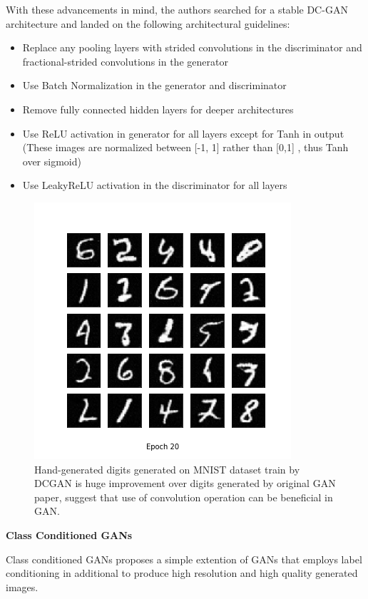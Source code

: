 \documentclass{article}
\begin{document}
With these advancements in mind, the authors searched for a stable DC-GAN architecture and landed on the following architectural guidelines:

\begin{itemize}

    \item Replace any pooling layers with strided convolutions in the discriminator and fractional-strided convolutions in the generator
    \item Use Batch Normalization in the generator and discriminator
    \item Remove fully connected hidden layers for deeper architectures
    \item Use ReLU activation in generator for all layers except for Tanh in output (These images are normalized between [-1, 1] rather than [0,1] , thus Tanh over sigmoid)
    \item Use LeakyReLU activation in the discriminator for all layers

\end{itemize}


\begin{figure}[h]
    \centering
    \includegraphics[width=.5\textwidth]{images/dcgan_result.png}
    \caption{Hand-generated digits generated on MNIST dataset train by DCGAN is huge improvement over digits generated by original GAN paper, suggest that use of convolution operation can be beneficial in GAN. }
    \label{fig:mesh1}
\end{figure}
\medskip


\medskip

\medskip
\begin{center}
    {\Large{\textbf{Class Conditioned GANs}}}
\end{center}
Class conditioned GANs proposes a simple extention of GANs that employs label conditioning in additional to produce high resolution and high quality generated images.
\end{document}
